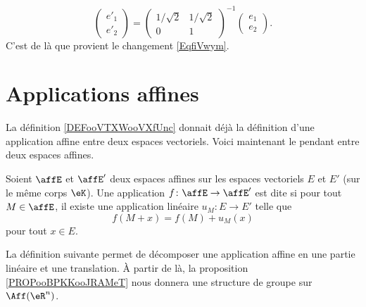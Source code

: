 \begin{example}
\begin{equation}
        \begin{pmatrix}
            e'_1    \\
            e'_2
        \end{pmatrix}=\begin{pmatrix}
            1/\sqrt{2}    &   1/\sqrt{2}    \\
            0    &   1
        \end{pmatrix}^{-1}\begin{pmatrix}
            e_1    \\
            e_2
        \end{pmatrix}.
    \end{equation}
    C'est de là que provient le changement \eqref{EqfiVwym}.
\end{example}

\section{Applications affines}

La définition \ref{DEFooVTXWooVXfUnc} donnait déjà la définition d'une application affine entre deux espaces vectoriels. Voici maintenant le pendant entre deux espaces affines.
\begin{definition}      \label{DEFooUAWZooXcMKve}
    Soient \( \affE\) et \( \affE'\) deux espaces affines sur les espaces vectoriels \( E\) et \( E'\) (sur le même corps \( \eK\)). Une application \( f\colon \affE\to \affE'\) est dite  si pour tout \( M\in \affE\), il existe une application linéaire \( u_M\colon E\to E'\) telle que
    \begin{equation}    \label{EqMqIoWX}
        f(M+x)=f(M)+u_M(x)
    \end{equation}
    pour tout \( x\in E\).
\end{definition}

La définition suivante permet de décomposer une application affine en une partie linéaire et une translation. À partir de là, la proposition \ref{PROPooBPKKooJRAMeT} nous donnera une structure de groupe sur \( \Aff(\eR^n)\).

